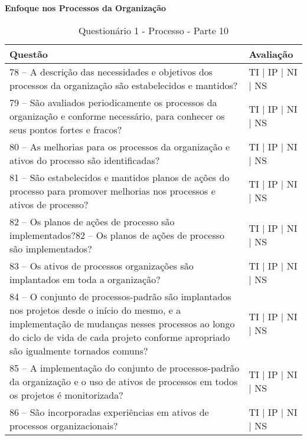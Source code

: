 \documentclass[openany,10pt,a4paper]{article}
\begin{document}
\begin{appendix}
\begin{table}[h]
\textbf{Enfoque nos Processos da Organização}
	\centering
	\caption{Questionário 1 - Processo - Parte 10}
	\begin{tabular}{p{3.5in}p{2in}}		
		\toprule
		\textbf{Questão}  & \textbf{Avaliação}\\ 
		\midrule
		78 – A descrição das necessidades e objetivos dos processos da organização são estabelecidos e 
mantidos?
 & TI | IP | NI | NS \\
        \midrule
		79 – São avaliados periodicamente os processos da organização e conforme necessário, para 
conhecer os seus pontos fortes e fracos?
 & TI | IP | NI | NS \\
		\midrule
		80 – As melhorias para os processos da organização e ativos do processo são identificadas?
 & TI | IP | NI | NS \\
		\midrule
        81 – São estabelecidos e mantidos planos de ações do processo para promover melhorias nos 
processos e ativos de processo?
 & TI | IP | NI | NS \\
		\midrule
		82 – Os planos de ações de processo são implementados?82 – Os planos de ações de processo são implementados?
  & TI | IP | NI | NS \\
		\midrule
		83 – Os ativos de processos organizações são implantados em toda a organização?
 & TI | IP | NI | NS \\
        \midrule
		84 – O conjunto de processos-padrão são implantados nos projetos desde o início do mesmo, e 
a implementação de mudanças nesses processos ao longo do ciclo de vida de cada projeto
conforme apropriado são igualmente tornados comuns? 
 & TI | IP | NI | NS \\
 \midrule
		85 – A implementação do conjunto de processos-padrão da organização e o uso de ativos de
processos em todos os projetos é monitorizada? 
 & TI | IP | NI | NS \\\midrule
		86 – São incorporadas experiências em ativos de processos organizacionais?
 & TI | IP | NI | NS \\
		\bottomrule
	\end{tabular} 
	\label{tab:tabela1}
\end{table}


\end{appendix}
\end{document}
